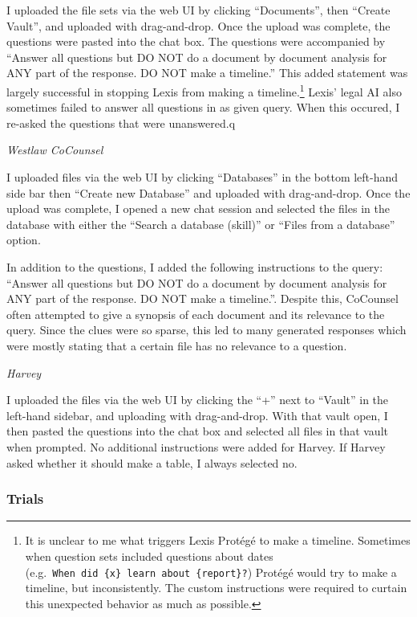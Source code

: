 \documentclass[
]{article}
\begin{document}
I uploaded the file sets via the web UI by clicking ``Documents'', then
``Create Vault'', and uploaded with drag-and-drop. Once the upload was
complete, the questions were pasted into the chat box. The questions
were accompanied by ``Answer all questions but DO NOT do a document by
document analysis for ANY part of the response. DO NOT make a
timeline.'' This added statement was largely successful in stopping
Lexis from making a timeline.\footnote{It is unclear to me what triggers
  Lexis Protégé to make a timeline. Sometimes when question sets
  included questions about dates
  (e.g.~\texttt{When\ did\ \{x\}\ learn\ about\ \{report\}?}) Protégé
  would try to make a timeline, but inconsistently. The custom
  instructions were required to curtain this unexpected behavior as much
  as possible.} Lexis' legal AI also sometimes failed to answer all
questions in as given query. When this occured, I re-asked the questions
that were unanswered.q

\emph{Westlaw CoCounsel}

I uploaded files via the web UI by clicking ``Databases'' in the bottom
left-hand side bar then ``Create new Database'' and uploaded with
drag-and-drop. Once the upload was complete, I opened a new chat session
and selected the files in the database with either the ``Search a
database (skill)'' or ``Files from a database'' option.

In addition to the questions, I added the following instructions to the
query: ``Answer all questions but DO NOT do a document by document
analysis for ANY part of the response. DO NOT make a timeline.''.
Despite this, CoCounsel often attempted to give a synopsis of each
document and its relevance to the query. Since the clues were so sparse,
this led to many generated responses which were mostly stating that a
certain file has no relevance to a question.

\emph{Harvey}

I uploaded the files via the web UI by clicking the ``+'' next to
``Vault'' in the left-hand sidebar, and uploading with drag-and-drop.
With that vault open, I then pasted the questions into the chat box and
selected all files in that vault when prompted. No additional
instructions were added for Harvey. If Harvey asked whether it should
make a table, I always selected no.

\subsubsection{Trials}\label{trials}
\end{document}

